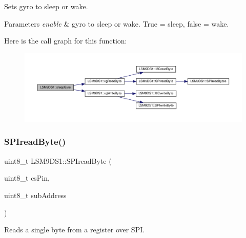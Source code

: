 Sets gyro to sleep or wake. 


\begin{DoxyParams}{Parameters}
{\em enable} & gyro to sleep or wake. True = sleep, false = wake. \\
\hline
\end{DoxyParams}
Here is the call graph for this function\+:\nopagebreak
\begin{figure}[H]
\begin{center}
\leavevmode
\includegraphics[width=350pt]{classLSM9DS1_a13b61812069b399547f177b0b0af8fe3_cgraph}
\end{center}
\end{figure}
\mbox{\label{classLSM9DS1_a6f0f50bb5e9b702d5a19c7441a3f9d8b}} 
\subsubsection{\texorpdfstring{S\+P\+Iread\+Byte()}{SPIreadByte()}}
{\footnotesize\ttfamily uint8\+\_\+t L\+S\+M9\+D\+S1\+::\+S\+P\+Iread\+Byte (\begin{DoxyParamCaption}\item[{uint8\+\_\+t}]{cs\+Pin,  }\item[{uint8\+\_\+t}]{sub\+Address }\end{DoxyParamCaption})\hspace{0.3cm}{\ttfamily [protected]}}



Reads a single byte from a register over S\+PI. 


